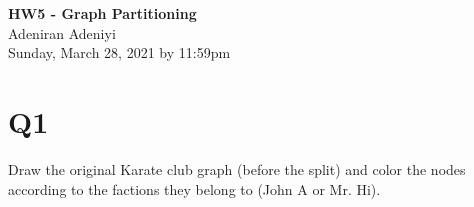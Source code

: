 \documentclass[12pt]{article}
\begin{document}
\begin{centering}
{\large\textbf{HW5 - Graph Partitioning}}\\ %
Adeniran Adeniyi\\                     %
Sunday, March 28, 2021 by 11:59pm\\                      %
\end{centering}



\section*{Q1}
Draw the original Karate club graph (before the split) and color the nodes according to the factions they belong to (John A or Mr. Hi).
\subsection*{\color{blue}{Answer}}

\end{document}
